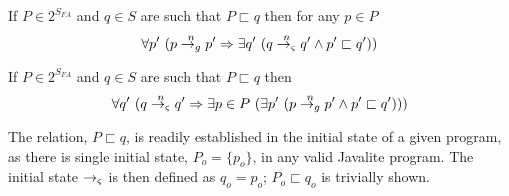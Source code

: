 \begin{corollary}
If $P \in 2^{S_\mathit{FA}}$ and $q \in S$ are such that $P \sqsubset q$ then for any $p \in P$
$$
\forall p^\prime\ (p \stackrel{n}{\rightarrow_{g}} p^\prime \Rightarrow \exists q^\prime\ (q \stackrel{n}{\rightarrow_{\varsigma}} q^\prime \wedge p^\prime \sqsubset q^\prime))
$$
\end{corollary}

\begin{corollary}
If $P \in 2^{S_\mathit{FA}}$ and $q \in S$ are such that $P \sqsubset q$ then
$$
\forall q^\prime\ (q \stackrel{n}{\rightarrow_{\varsigma}} q^\prime \Rightarrow \exists p \in P\ (\exists p^\prime\ (p \stackrel{n}{\rightarrow_{g}} p^\prime \wedge p^\prime \sqsubset q^\prime)))
$$
\end{corollary}

The relation, $P \sqsubset q$, is readily established in the initial
state of a given program, as there is single initial state, $P_o =
\{p_o\}$, in any valid Javalite program. The initial state $\rightarrow_{\varsigma}$ is
then defined as $q_o = p_o$; $P_o \sqsubset q_o$ is trivially shown.
